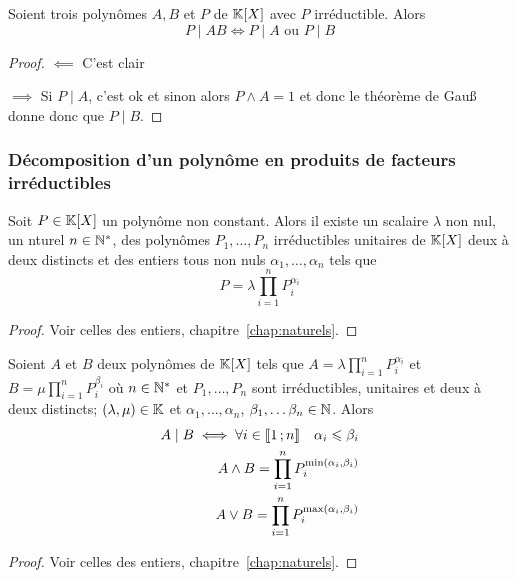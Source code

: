 \begin{prop}
  Soient trois polynômes \(A,B\) et \(P\) de \(\mathbb{K}[X]\) avec \(P\) irréductible. 
  Alors
  \begin{equation}
    P\mid{}AB \iff P\mid{}A \text{~ou~} P\mid{}B
  \end{equation}
\end{prop}
\begin{proof}
  \(\impliedby\) C'est clair

  \(\implies\) Si \(P\mid{}A\), c'est ok et sinon alors \(P \wedge A = 1\) et donc 
  le théorème de Gau\ss{} donne donc que \(P\mid{}B\).
\end{proof}

\subsubsection{Décomposition d'un polynôme en produits de facteurs 
irréductibles}

\begin{theo}
  Soit \(P \in \mathbb{K}[X]\) un polynôme non constant. Alors il existe un scalaire 
  \(\lambda\) non nul, un nturel \(n \in \mathbb{N}^*\), des polynômes \(P_1, \ldots, 
  P_n\) irréductibles unitaires de \(\mathbb{K}[X]\) deux à deux distincts et des 
  entiers tous non nuls \(\alpha_1, \ldots, \alpha_n\) tels que
  \begin{equation}
    P = \lambda \prod_{i = 1}^n P_i^{\alpha_i}
  \end{equation}
\end{theo}
\begin{proof}
  Voir celles des entiers, chapitre~\ref{chap:naturels}.
\end{proof}

\begin{cor}
  Soient \(A\) et \(B\) deux polynômes de \(\mathbb{K}[X]\) tels que \(A = \lambda 
  \prod_{i = 1}^n P_i^{\alpha_i}\) et \(B = \mu \prod_{i = 1}^n P_i^{\beta_i}\) où \(n 
  \in \mathbb{N}^*\) et \(P_1, \ldots, P_n\) sont irréductibles, unitaires et deux à 
  deux distincts; \((\lambda, \mu)\in\mathbb{K}\) et \(\alpha_1, \ldots, \alpha_n\), 
  \(\beta_1,\ldots \beta_n \in \mathbb{N}\). Alors
  \begin{align}
    A\mid{}B \iff \forall i \in \mathopen{\llbracket}1\mathclose{}\mathpunct{};n\mathclose{\rrbracket} \quad \alpha_i \leqslant 
    \beta_i \\
    A \wedge B = \prod_{i = 1}^n P_i^{\min(\alpha_i,\beta_i)}\\
    A \vee B = \prod_{i = 1}^n P_i^{\max(\alpha_i,\beta_i)}
  \end{align}
\end{cor}
\begin{proof}
  Voir celles des entiers, chapitre~\ref{chap:naturels}.
\end{proof}
